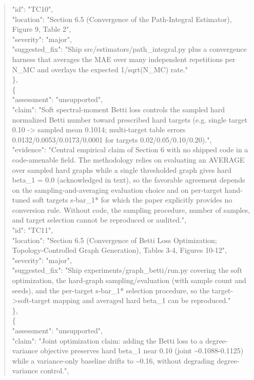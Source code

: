\documentclass[11pt]{article}
\begin{document}
\begin{quote}
      "id": "TC10",\\
      "location": "Section 6.5 (Convergence of the Path-Integral Estimator), Figure 9, Table 2",\\
      "severity": "major",\\
      "suggested\_fix": "Ship src/estimators/path\_integral.py plus a convergence harness that averages the MAE over many independent repetitions per N\_MC and overlays the expected 1/sqrt(N\_MC) rate."\\
    \},\\
    \{\\
      "assessment": "unsupported",\\
      "claim": "Soft spectral-moment Betti loss controls the sampled hard normalized Betti number toward prescribed hard targets (e.g. single target 0.10 -> sampled mean 0.1014; multi-target table errors 0.0132/0.0053/0.0173/0.0001 for targets 0.02/0.05/0.10/0.20).",\\
      "evidence": "Central empirical claim of Section 6 with no shipped code in a code-amenable field. The methodology relies on evaluating an AVERAGE over sampled hard graphs while a single thresholded graph gives hard beta\_1 = 0.0 (acknowledged in text), so the favorable agreement depends on the sampling-and-averaging evaluation choice and on per-target hand-tuned soft targets s-bar\_1* for which the paper explicitly provides no conversion rule. Without code, the sampling procedure, number of samples, and target selection cannot be reproduced or audited.",\\
      "id": "TC11",\\
      "location": "Section 6.5 (Convergence of Betti Loss Optimization; Topology-Controlled Graph Generation), Tables 3-4, Figures 10-12",\\
      "severity": "major",\\
      "suggested\_fix": "Ship experiments/graph\_betti/run.py covering the soft optimization, the hard-graph sampling/evaluation (with sample count and seeds), and the per-target s-bar\_1* selection procedure, so the target->soft-target mapping and averaged hard beta\_1 can be reproduced."\\
    \},\\
    \{\\
      "assessment": "unsupported",\\
      "claim": "Joint optimization claim: adding the Betti loss to a degree-variance objective preserves hard beta\_1 near 0.10 (joint \~{}0.1088-0.1125) while a variance-only baseline drifts to \~{}0.16, without degrading degree-variance control.",\\

\end{quote}
\end{document}
